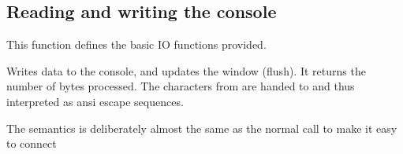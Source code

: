 \documentclass[11pt]{article}
\begin{document}
\subsection{Reading and writing the console}

This function defines the basic IO functions provided.

\begin{description}
    Writes data to the console, and updates the window (flush). It
    returns the number of bytes processed. The characters from
     are handed to  and thus interpreted
    as {\sc ansi} escape sequences.

    The semantics is deliberately almost the same as the normal
     call to make it easy to connect
    



\end{description}

    
\end{document}
